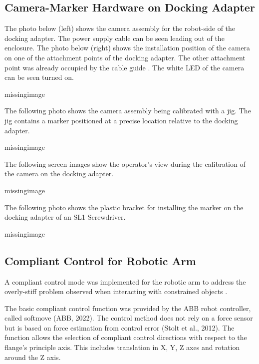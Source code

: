 \subsection{Camera-Marker Hardware on Docking Adapter}
\label{subsection:exploration-4-camera-marker-hardware-on-docking-adapter}

The photo below (left) shows the camera assembly for the robot-side of the docking adapter. The power supply cable can be seen leading out of the enclosure. The photo below (right) shows the installation position of the camera on one of the attachment points of the docking adapter. The other attachment point was already occupied by the cable guide . The white LED of the camera can be seen turned on.

missingimage

The following photo shows the camera assembly being calibrated with a jig. The jig contains a marker positioned at a precise location relative to the docking adapter.

missingimage

The following screen images show the operator’s view during the calibration of the camera on the docking adapter.

missingimage

The following photo shows the plastic bracket for installing the marker on the docking adapter of an SL1 Screwdriver. 

missingimage

\subsection{Compliant Control for Robotic Arm}
\label{subsection:exploration-4-compliant-control-for-robotic-arm}

A compliant control mode was implemented for the robotic arm to address the overly-stiff problem observed when interacting with constrained objects .

The basic compliant control function was provided by the ABB robot controller, called softmove (ABB, 2022). The control method does not rely on a force sensor but is based on force estimation from control error (Stolt et al., 2012). The function allows the selection of compliant control directions with respect to the flange’s principle axis. This includes translation in X, Y, Z axes and rotation around the Z axis. 

